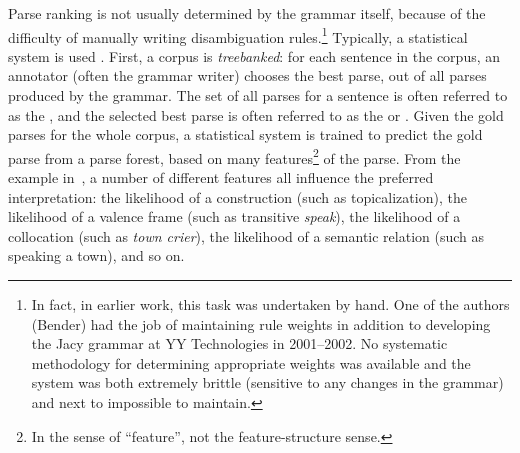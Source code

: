 \documentclass[output=paper,nonflat]{langsci/langscibook}
\begin{document}
Parse ranking is not usually determined by the grammar itself, because
of the difficulty of manually writing disambiguation
rules.\footnote{In fact, in earlier work, this task was undertaken by
  hand. One of the authors (Bender) had the job of maintaining rule
  weights in addition to developing the Jacy grammar \citep*{SBB2016a}
  at YY Technologies in 2001--2002. No systematic methodology for
  determining appropriate weights was available and the system was
  both extremely brittle (sensitive to any changes in the grammar) and
  next to impossible to maintain.}
Typically, a statistical system is used \citep{Tou:Man:Shi:Fli:Oep:02,Tou:Man:Fli:Oep:05}.
First, a corpus is \textit{treebanked}:
for each sentence in the corpus,
an annotator (often the grammar writer) chooses the best parse,
out of all parses produced by the grammar.
The set of all parses for a sentence is often referred to as the \textit{},
and the selected best parse is often referred to as the \textit{} or \textit{}.
Given the gold parses for the whole corpus, a statistical system is trained
to predict the gold parse from a parse forest,
based on many features\footnote{%
	In the  sense of ``feature'',
	not the feature-structure sense.
}
of the parse.
From the example in~,
a number of different features all influence the preferred interpretation:
the likelihood of a construction (such as topicalization),
the likelihood of a valence frame (such as transitive \textit{speak}),
the likelihood of a collocation (such as \textit{town crier}),
the likelihood of a semantic relation (such as speaking a town),
and so on.
\end{document}
